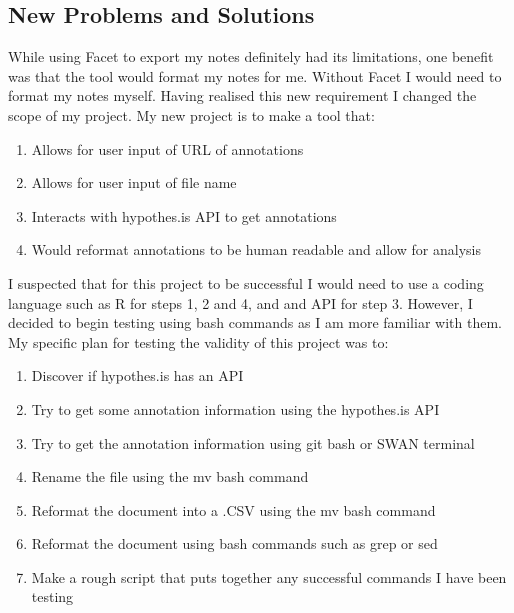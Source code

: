 \documentclass{article}
\begin{document}
\subsection{New Problems and Solutions}
While using Facet to export my notes definitely had its limitations, one benefit was that the tool would format my notes for me. Without Facet I would need to format my notes myself. Having realised this new requirement I changed the scope of my project. My new project is to make a tool that:
\begin{enumerate}
\item Allows for user input of URL of annotations
\item Allows for user input of file name
\item Interacts with hypothes.is API to get annotations
\item Would reformat annotations to be human readable and allow for analysis
\end{enumerate}
I suspected that for this project to be successful I would need to use a coding language such as R for steps 1, 2 and 4, and and API for step 3. However, I decided to begin testing using bash commands as I am more familiar with them. My specific plan for testing the validity of this project was to:
\begin{enumerate}
\item Discover if hypothes.is has an API
\item Try to get some annotation information using the hypothes.is API
\item Try to get the annotation information using git bash or SWAN terminal
\item Rename the file using the mv bash command
\item Reformat the document into a .CSV using the mv bash command
\item Reformat the document using bash commands such as grep or sed
\item Make a rough script that puts together any successful commands I have been testing
\end{enumerate}
\end{document}
